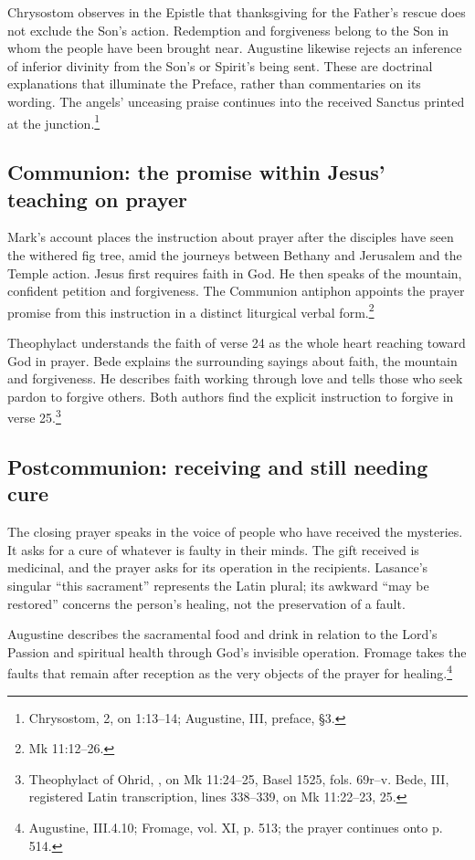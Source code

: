 Chrysostom observes in the Epistle that thanksgiving for the Father's
rescue does not exclude the Son's action. Redemption and forgiveness
belong to the Son in whom the people have been brought near.
Augustine likewise rejects an inference of inferior divinity from the
Son's or Spirit's being sent. These are doctrinal explanations that
illuminate the Preface, rather than commentaries on its wording.
The angels' unceasing praise continues into the received Sanctus
printed at the junction.\footnote{Chrysostom,
 2, on 1:13--14; Augustine,
 III, preface, §3.}

\subsection{Communion: the promise within Jesus' teaching on prayer}

Mark's account places the instruction about prayer after the disciples
have seen the withered fig tree, amid the journeys between Bethany
and Jerusalem and the Temple action. Jesus first requires faith in
God. He then speaks of the mountain, confident petition and forgiveness.
The Communion antiphon appoints the prayer promise from this instruction
in a distinct liturgical verbal form.\footnote{Mk 11:12--26.}

Theophylact understands the faith of verse 24 as the whole heart
reaching toward God in prayer. Bede explains the surrounding sayings
about faith, the mountain and forgiveness. He describes faith working
through love and tells those who seek pardon to forgive others. Both
authors find the explicit instruction to forgive in verse 25.\footnote{Theophylact
of Ohrid, , on Mk 11:24--25, Basel 1525,
fols. 69r--v. Bede,  III,
registered Latin transcription, lines 338--339, on Mk 11:22--23, 25.}

\subsection{Postcommunion: receiving and still needing cure}

The closing prayer speaks in the voice of people who have received the
mysteries. It asks for a cure of whatever is faulty in their minds.
The gift received is medicinal, and the prayer asks for its operation
in the recipients. Lasance's singular ``this sacrament'' represents
the Latin plural; its awkward ``may be restored'' concerns the person's
healing, not the preservation of a fault.

Augustine describes the sacramental food and drink in relation to the
Lord's Passion and spiritual health through God's invisible operation.
Fromage takes the faults that remain after reception as the very
objects of the prayer for healing.\footnote{Augustine,  III.4.10;
Fromage, vol. XI, p. 513; the prayer continues onto p. 514.}
